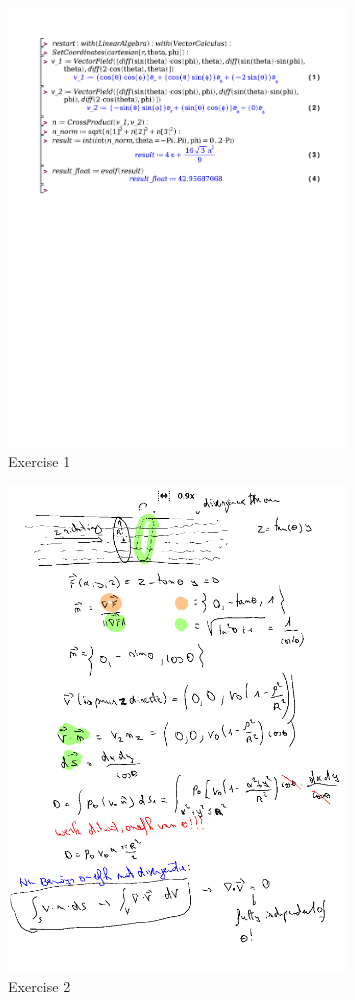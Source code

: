 \documentclass[a4paper]{report}
\begin{document}
\begin{figure}[H]
	\centering
	\includegraphics[width=0.8\textwidth]{exercises/huis_7_ex_1.pdf}
	\caption{Exercise 1}
	\label{fig:huis_7_ex_1}
\end{figure}


\begin{figure}[H]
	\centering
	\includegraphics[width=0.8\textwidth]{assets/huis_7_ex_2.png}
	\caption{Exercise 2}
	\label{fig:huis_7_ex_2}
\end{figure}
\end{document}
